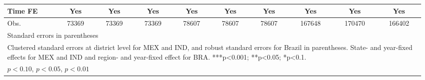 \begin{table}[htbp]
\begin{tabular}{l*{9}{c}}
Time FE     &         Yes         &         Yes         &         Yes         &         Yes         &         Yes         &         Yes         &         Yes         &         Yes         &         Yes         \\
\hline
Obs.        &       73369         &       73369         &       73369         &       78607         &       78607         &       78607         &      167648         &      170470         &      166402         \\
\hline\hline
\multicolumn{10}{l}{\footnotesize Standard errors in parentheses}\\
\multicolumn{10}{l}{\footnotesize Clustered standard errors at district level for MEX and IND, and robust standard errors for Brazil in parentheses. State- and year-fixed effects for MEX and IND and region- and year-fixed effect for BRA. ***p<0.001; **p<0.05; *p<0.1.}\\
\multicolumn{10}{l}{\footnotesize \sym{*} \(p<0.10\), \sym{**} \(p<0.05\), \sym{***} \(p<0.01\)}\\
\end{tabular}
\end{table}
